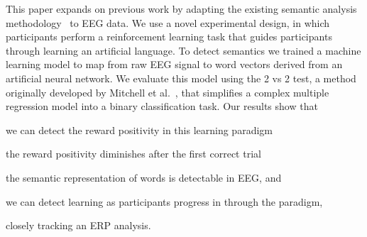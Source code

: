 This paper expands on previous work by adapting the existing semantic analysis 
methodology~\cite{Mitchell2008,Sudre2012} to EEG data.  We use a novel 
experimental design, in which participants perform a reinforcement learning 
task that guides participants through learning an artificial language. To 
detect semantics we trained a machine learning model to map from raw EEG signal 
to word vectors derived from an artificial neural network. We evaluate this 
model using the 2 vs 2 test, a method originally developed by Mitchell et 
al.~\cite{Mitchell2008}, that simplifies a complex multiple regression model 
into a binary classification task. Our results show that 
\begin{inparaenum}[(1)]
  \item we can detect the reward positivity in this learning paradigm
  \item the reward positivity diminishes after the first correct trial
  \item the semantic representation of words is detectable in EEG, and \item we 
  can detect learning as participants progress in through the paradigm,
\end{inparaenum}
closely tracking an ERP analysis.

